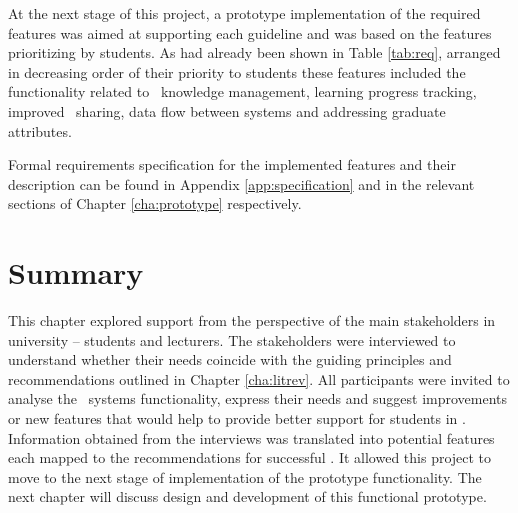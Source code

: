 At the next stage of this project, a prototype implementation of the required
features was aimed at supporting each guideline and was based on the features
prioritizing by students. As had already been shown in Table \ref{tab:req},
arranged in decreasing order of their priority to students these features
included the functionality related to \ep~knowledge management, learning
progress tracking, improved \ep~sharing, data flow between systems and
addressing graduate attributes.

Formal requirements specification for the implemented features and their
description can be found in Appendix \ref{app:specification} and in the relevant
sections of Chapter \ref{cha:prototype} respectively.

\section{Summary}

This chapter explored \LLLs support from the perspective of the main
stakeholders in university -- students and lecturers. The stakeholders were
interviewed to understand whether their needs coincide with the guiding
principles and recommendations outlined in Chapter \ref{cha:litrev}. All
participants were invited to analyse the \ep~systems functionality, express
their needs and suggest improvements or new features that would help to provide
better support for students in \LLLsn. Information obtained from the interviews
was translated into potential features each mapped to the recommendations for
successful \LLLsn. It allowed this project to move to the next stage of
implementation of the prototype functionality. The next chapter will discuss
design and development of this functional prototype.
